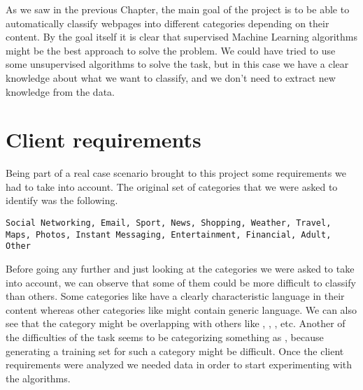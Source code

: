 
As we saw in the previous Chapter, the main goal of the project is to be able to automatically classify webpages into different categories depending on their content. 
By the goal itself it is clear that supervised Machine Learning algorithms might be the best approach to solve the problem. We could have tried to use some unsupervised algorithms to solve the task,
but in this case we have a clear knowledge about what we want to classify, and we don't need to extract new knowledge from the data.

\section{Client requirements}

Being part of a real case scenario brought to this project some requirements we had to take into account. The original set of categories that we were asked to identify was the following.


\begin{lstlisting}
Social Networking, Email, Sport, News, Shopping, Weather, Travel, Maps, Photos, Instant Messaging, Entertainment, Financial, Adult, Other
\end{lstlisting}

Before going any further and just looking at the categories we were asked to take into account, we can observe that some of them could be more difficult to classify than others.
Some categories like  have a clearly characteristic language in their content whereas other categories like  might contain generic language.
We can also see that the category  might be overlapping with others like , , , etc. 
Another of the difficulties of the task seems to be categorizing something as , because generating a training set for such a category might be difficult. 
Once the client requirements were analyzed we needed data in order to start experimenting with the algorithms.

